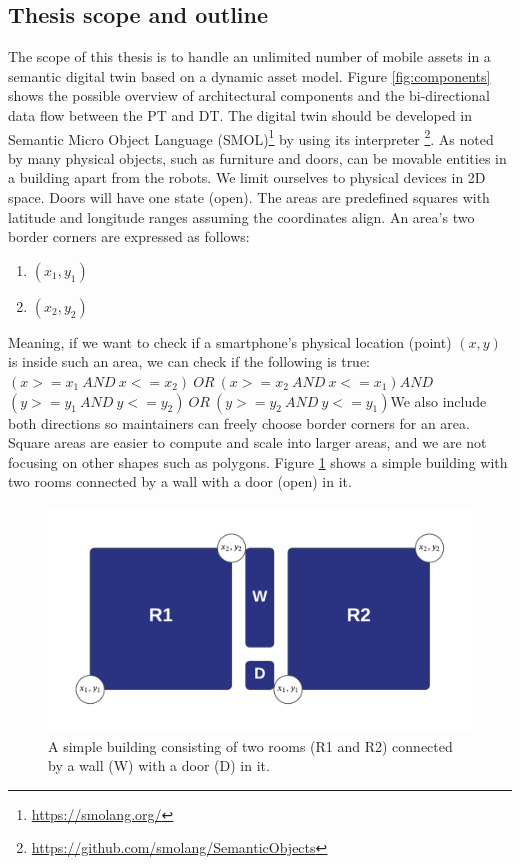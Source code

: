 \documentclass{article}
\begin{document}
\subsection{Thesis scope and outline}
The scope of this thesis is to handle an unlimited number of mobile assets in a semantic digital twin based on a dynamic asset model. Figure \ref{fig:components} shows the possible overview of architectural components and the bi-directional data flow between the PT and DT. The digital twin should be developed in Semantic Micro Object Language (SMOL)\footnote{\url{https://smolang.org/}} by using its interpreter \footnote{\url{https://github.com/smolang/SemanticObjects}}.
As noted by \citeauthor{pauwels_live_2023} many physical objects, such as furniture and doors, can be movable entities in a building apart from the robots. We limit ourselves to physical devices in 2D space. Doors will have one state (open). The areas are predefined squares with latitude and longitude ranges assuming the coordinates align. An area's two border corners are expressed as follows:
\begin{enumerate}
    \item $(x_1, y_1)$
    \item $(x_2, y_2)$
\end{enumerate}
Meaning, if we want to check if a smartphone's physical location (point) $(x, y)$ is inside such an area, we can check if the following is true:\newline\newline$(x >= x_1\:AND\: x <= x_2)\:OR\:(x >= x_2\:AND\:x <= x_1)$\newline$AND$\newline$(y >= y_1\:AND\:y <= y_2)\:OR\:(y >= y_2\:AND\:y <= y_1)$\newline We also include both directions so maintainers can freely choose border corners for an area. Square areas are easier to compute and scale into larger areas, and we are not focusing on other shapes such as polygons.\newline
Figure \ref{fig:simple_building} shows a simple building with two rooms connected by a wall with a door (open) in it.

\begin{figure}[!h]
    \centering
    \includegraphics[scale=0.3]{graphics/simple_building.png}
    \caption{A simple building consisting of two rooms (R1 and R2) connected by a wall (W) with a door (D) in it.}
    \label{fig:simple_building}
\end{figure}
\end{document}
